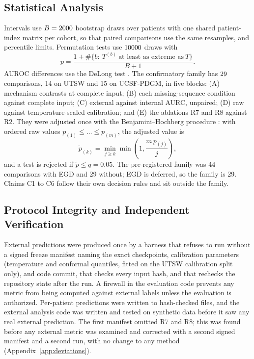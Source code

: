 \documentclass[journal]{IEEEtran}
\begin{document}
\subsection{Statistical Analysis}
Intervals use $B=2000$ bootstrap draws over patients \cite{efron1979} with one shared patient-index matrix per cohort, so that paired comparisons use the same resamples, and percentile limits. Permutation tests use $10000$ draws with
\begin{equation}
p=\frac{1+\#\{b:\ T^{(b)}\ \text{at least as extreme as}\ T\}}{B+1}.
\end{equation}
AUROC differences use the DeLong test \cite{delong1988}. The confirmatory family has $29$ comparisons, 14 on UTSW and 15 on UCSF-PDGM, in five blocks: (A) mechanism contrasts at complete input; (B) each missing-sequence condition against complete input; (C) external against internal AURC, unpaired; (D) raw against temperature-scaled calibration; and (E) the ablations R7 and R8 against R2. They were adjusted once with the Benjamini--Hochberg procedure \cite{benjamini1995}: with ordered raw values $p_{(1)}\le\dots\le p_{(m)}$, the adjusted value is
\begin{equation}
\tilde p_{(k)}=\min_{j\ge k}\min\!\left(1,\frac{m\,p_{(j)}}{j}\right),
\end{equation}
and a test is rejected if $\tilde p\le q=0.05$. The pre-registered family was 44 comparisons with EGD and 29 without; EGD is deferred, so the family is 29. Claims C1 to C6 follow their own decision rules and sit outside the family.

\subsection{Protocol Integrity and Independent Verification}
\label{sec:integrity}
External predictions were produced once by a harness that refuses to run without a signed freeze manifest naming the exact checkpoints, calibration parameters (temperature and conformal quantiles, fitted on the UTSW calibration split only), and code commit, that checks every input hash, and that rechecks the repository state after the run. A firewall in the evaluation code prevents any metric from being computed against external labels unless the evaluation is authorized. Per-patient predictions were written to hash-checked files, and the external analysis code was written and tested on synthetic data before it saw any real external prediction. The first manifest omitted R7 and R8; this was found before any external metric was examined and corrected with a second signed manifest and a second run, with no change to any method (Appendix~\ref{app:deviations}).
\end{document}
